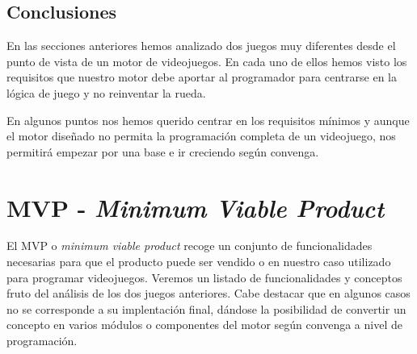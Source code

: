 \documentclass[a4paper]{article}
\begin{document}
\subsection{Conclusiones}

En las secciones anteriores hemos analizado dos juegos muy diferentes desde el punto de vista de un motor de videojuegos. En cada uno de ellos hemos visto los requisitos que nuestro motor debe aportar al programador para centrarse en la lógica de juego y no reinventar la rueda.

En algunos puntos nos hemos querido centrar en los requisitos mínimos y aunque el motor diseñado no permita la programación completa de un videojuego, nos permitirá empezar por una base e ir creciendo según convenga.

\section{MVP - \textit{Minimum Viable Product}}

El MVP o \textit{minimum viable product} recoge un conjunto de funcionalidades necesarias para que el producto puede ser vendido o en nuestro caso utilizado para programar videojuegos. Veremos un listado de funcionalidades y conceptos fruto del análisis de los dos juegos anteriores. Cabe destacar que en algunos casos no se corresponde a su implentación final, dándose la posibilidad de convertir un concepto en varios módulos o componentes del motor según convenga a nivel de programación.
\end{document}
